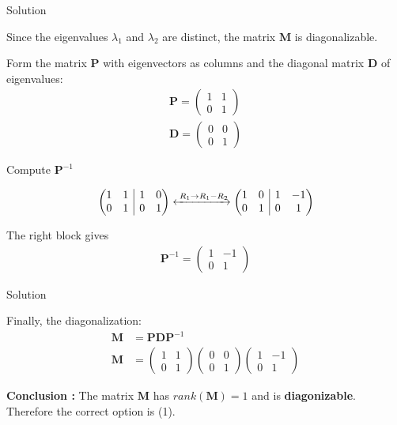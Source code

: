 \documentclass{beamer}
\makeatletter
\numberwithin{equation}{section}
\theoremstyle{remark}
\newcommand{\myvec}[1]{\ensuremath{\begin{pmatrix}#1\end{pmatrix}}}
\newenvironment{amatrix}[1]{%
  \left(\begin{array}{@{}*{#1}{c}|*{#1}{c}@{}}
}{%
  \end{array}\right)
}
\newcommand{\myaugvec}[2]{\ensuremath{\begin{amatrix}{#1}#2\end{amatrix}}}
\let\vec\mathbf
\makeatother
\begin{document}
\begin{frame}{Solution}

Since the eigenvalues $\lambda_1$ and $\lambda_2$ are distinct, the matrix $\vec{M}$ is diagonalizable.

Form the matrix $\vec{P}$ with eigenvectors as columns and the diagonal matrix $\vec{D}$ of eigenvalues:
\begin{align}
\vec{P} = \myvec{1 & 1 \\ 0 & 1}\\
\vec{D} = \myvec{0 & 0 \\ 0 & 1}
\end{align}

Compute $\vec{P}^{-1}$ 

\begin{align}
\myaugvec{2}{1 & 1 & 1 & 0\\0 & 1 & 0 & 1}
\xleftrightarrow{\;R_1 \to R_1 - R_2}
\myaugvec{2}{1 & 0 & 1 & -1\\0 & 1 & 0 & 1}
\end{align}

The right block gives
\begin{align}
\vec{P}^{-1} = \myvec{1 & -1 \\ 0 & 1}
\end{align}

\end{frame}

\begin{frame}{Solution}

Finally, the diagonalization:
\begin{align}
  \vec{M} &= \vec{P}\vec{D}\vec{P}^{-1} \\
  \vec{M} &= \myvec{1 & 1 \\ 0 & 1}\myvec{0 & 0 \\ 0 & 1}\myvec{1 & -1 \\ 0 & 1}
\end{align}

\textbf{Conclusion :} The matrix $\vec{M}$ has $rank(\vec{M}) = 1$ and is \textbf{diagonizable}.\\
Therefore the correct option is (1).

\end{frame}
\end{document}
